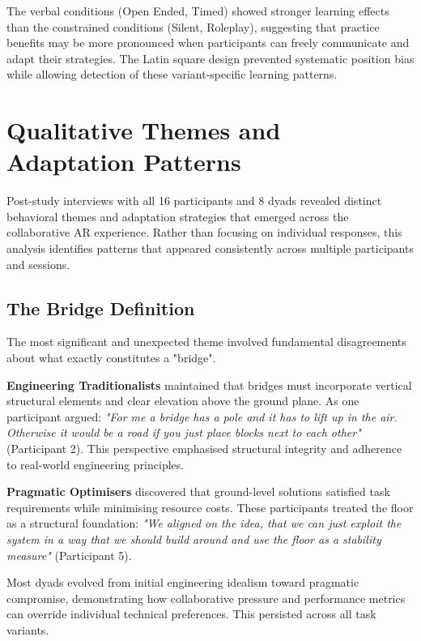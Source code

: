 The verbal conditions (Open Ended, Timed) showed stronger learning effects than the constrained conditions (Silent, Roleplay), suggesting that practice benefits may be more pronounced when participants can freely communicate and adapt their strategies. The Latin square design prevented systematic position bias while allowing detection of these variant-specific learning patterns.

\section{Qualitative Themes and Adaptation Patterns}\label{sec:qualitative}

Post-study interviews with all 16 participants and 8 dyads revealed distinct behavioral themes and adaptation strategies that emerged across the collaborative AR experience. Rather than focusing on individual responses, this analysis identifies patterns that appeared consistently across multiple participants and sessions.

\subsection{The Bridge Definition}

The most significant and unexpected theme involved fundamental disagreements about what exactly constitutes a "bridge".

\textbf{Engineering Traditionalists} maintained that bridges must incorporate vertical structural elements and clear elevation above the ground plane. As one participant argued: \textit{"For me a bridge has a pole and it has to lift up in the air. Otherwise it would be a road if you just place blocks next to each other"} (Participant 2). This perspective emphasised structural integrity and adherence to real-world engineering principles.

\textbf{Pragmatic Optimisers} discovered that ground-level solutions satisfied task requirements while minimising resource costs. These participants treated the floor as a structural foundation: \textit{"We aligned on the idea, that we can just exploit the system in a way that we should build around and use the floor as a stability measure"} (Participant 5).

Most dyads evolved from initial engineering idealism toward pragmatic compromise, demonstrating how collaborative pressure and performance metrics can override individual technical preferences. This persisted across all task variants.

